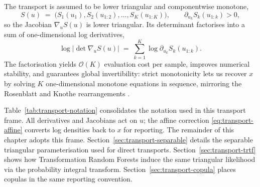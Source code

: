 \documentclass[11pt,a4paper,twoside]{book}\usepackage[]{graphicx}\usepackage[]{xcolor}
\begin{document}
The transport is assumed to be lower triangular and componentwise monotone,
\begin{equation}
  S(u) \;=\; \big(S_1(u_1), S_2(u_{1:2}), \ldots, S_K(u_{1:K})\big), \qquad \partial_{u_k}S_k(u_{1:k})>0,\label{eq:transport-triangular}
\end{equation}
so the Jacobian $\nabla_u S(u)$ is lower triangular. Its determinant factorises into a sum of one-dimensional log derivatives,
\begin{equation}
  \log \big|\det \nabla_u S(u)\big| \;=\; \sum_{k=1}^{K}\log \partial_{u_k}S_k(u_{1:k}).\label{eq:transport-det}
\end{equation}
The factorisation yields $\mathcal{O}(K)$ evaluation cost per sample, improves numerical stability, and guarantees global invertibility: strict monotonicity lets us recover $x$ by solving $K$ one-dimensional monotone equations in sequence, mirroring the Rosenblatt and Knothe rearrangements \citep{rosenblatt1952remarks,knothe1957contributions}.

Table~\ref{tab:transport-notation} consolidates the notation used in this transport frame. All derivatives and Jacobians act on $u$; the affine correction \eqref{eq:transport-affine} converts log densities back to $x$ for reporting. The remainder of this chapter adopts this frame. Section~\ref{sec:transport-separable} details the separable triangular parameterisation used for direct transports. Section~\ref{sec:transport-trtf} shows how Transformation Random Forests induce the same triangular likelihood via the probability integral transform. Section~\ref{sec:transport-copula} places copulas in the same reporting convention.
\end{document}
